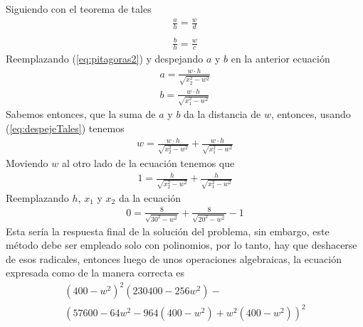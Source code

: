 \documentclass[ceqn,10pt]{SelfArx}
\begin{document}
Siguiendo con el teorema de tales
\begin{equation} \label{eq:tales}
\begin{aligned}
	\frac{a}{h} = \frac{w}{d}\\
	\\
	\frac{b}{h} = \frac{w}{c}
\end{aligned}
\end{equation}
Reemplazando (\ref{eq:pitagoras2}) y despejando $a$ y $b$ en la anterior ecuación
\begin{equation} \label{eq:despejeTales}
\begin{aligned}
	a = \frac{w \cdot h}{\sqrt{x_{2}^2-w^2}}\\
	b = \frac{w \cdot h}{\sqrt{x_{1}^2-w^2}}
\end{aligned}
\end{equation}
Sabemos entonces, que la suma de $a$ y $b$ da la distancia de $w$, entonces,
usando (\ref{eq:despejeTales}) tenemos
\begin{equation} \label{eq:obtenerW}
\begin{aligned}
	w = \frac{w \cdot h}{\sqrt{x_{2}^2-w^2}} + \frac{w \cdot h}{\sqrt{x_{1}^2-w^2}}
\end{aligned}
\end{equation}
Moviendo $w$ al otro lado de la ecuación tenemos que
\begin{equation} \label{eq:ecuacionW}
\begin{aligned}
	1 = \frac{h}{\sqrt{x_{2}^2-w^2}} + \frac{h}{\sqrt{x_{1}^2-w^2}}
\end{aligned}
\end{equation}
Reemplazando $h$, $x_{1}$ y $x_{2}$ da la ecuación
\begin{equation} \label{eq:despejeW}
\begin{aligned}
	0 = \frac{8}{\sqrt{30^2-w^2}} + \frac{8}{\sqrt{20^2-w^2}}-1
\end{aligned}
\end{equation}
Esta sería la respuesta final de la solución del problema, sin embargo, este método
debe ser empleado solo con polinomios, por lo tanto, hay que deshacerse de esos
radicales, entonces luego de unos operaciones algebraicas, la ecuación expresada como
de la manera correcta es
\begin{equation} \label{eq:despejeW}
\begin{aligned}
	(400-w^2)^2 (230400-256w^2)-\\
(57600-64 w^2-964 (400-w^2)+w^2 (400-w^2))^2
\end{aligned}
\end{equation}
\end{document}
